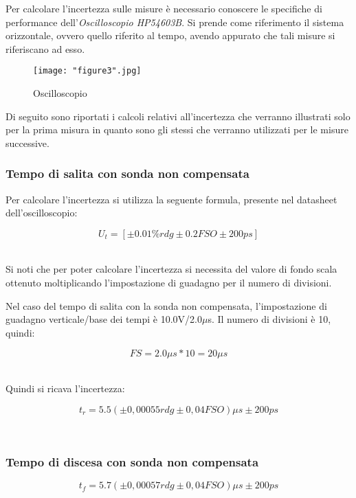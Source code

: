 \documentclass[a4paper]{article}
\begin{document}
Per calcolare l'incertezza sulle misure è necessario conoscere le specifiche di performance dell'\emph{Oscilloscopio HP54603B}. Si prende come riferimento il sistema orizzontale, ovvero quello riferito al tempo, avendo appurato che tali misure si riferiscano ad esso.

\begin{figure}[htp]
\centering
\texttt{[image: "figure3".jpg]}
\caption{Oscilloscopio}
\label{}
\end{figure}


Di seguito sono riportati i calcoli relativi all'incertezza che verranno illustrati solo per la prima misura in quanto sono gli stessi che verranno utilizzati per le misure successive.

\subsubsection{Tempo di salita con sonda non compensata}
Per calcolare l'incertezza si utilizza la seguente formula, presente nel datasheet dell'oscilloscopio:
\begin{Large}
	\begin{equation}
  		U_{t}=[\pm 0.01\%rdg\pm 0.2FSO \pm 200ps]
	\end{equation}
\end{Large}\\
Si noti che per poter calcolare l'incertezza si necessita del valore di fondo scala ottenuto moltiplicando l'impostazione di guadagno per il numero di divisioni.

Nel caso del tempo di salita con la sonda non compensata, l'impostazione di guadagno verticale/base dei tempi è 10.0V/2.0$\mu$s.
Il numero di divisioni è 10, quindi:
\begin{Large}
	\begin{equation}
  		FS=2.0\mu s * 10= 20\mu s
	\end{equation}
\end{Large}\\

Quindi si ricava l'incertezza:
\begin{Large}
	\begin{equation}
  		{t_r}= 5.5(\pm 0,00055 rdg \pm0,04 FSO)\mu s \pm200ps %
	\end{equation}
\end{Large}\\
\subsubsection{Tempo di discesa con sonda non compensata}
\begin{Large}
	\begin{equation}
  		{t_f}= 5.7(\pm 0,00057 rdg \pm0,04 FSO)\mu s \pm200ps %
	\end{equation}
\end{Large}\\
\end{document}
